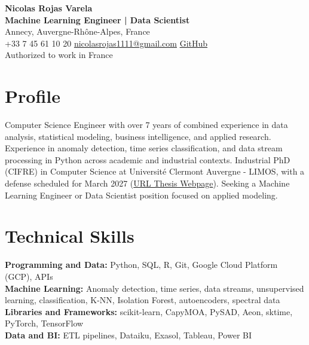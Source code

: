 \documentclass[12pt,a4paper]{article}
\begin{document}
{\centering
{\LARGE\textbf{Nicolas Rojas Varela}}\\[0.5mm]
{\large\textbf{Machine Learning Engineer | Data Scientist}}\\[0.5mm]
Annecy, Auvergne-Rhône-Alpes, France\\
+33 7 45 61 10 20 \textbar{} \href{mailto:nicolasrojas1111@gmail.com}{nicolasrojas1111@gmail.com} \textbar{} \href{https://github.com/nirojasva}{GitHub}\\
Authorized to work in France\par}
\vspace{1pt}

\section*{Profile}
Computer Science Engineer with over 7 years of combined experience in data analysis, statistical modeling, business intelligence, and applied research. Experience in anomaly detection, time series classification, and data stream processing in Python across academic and industrial contexts. Industrial PhD (CIFRE) in Computer Science at Université Clermont Auvergne - LIMOS, with a defense scheduled for March 2027 (\href{https://spectral-anomaly-detector.limos.fr/index_en.html}{URL Thesis Webpage}). Seeking a Machine Learning Engineer or Data Scientist position focused on applied modeling.

\section*{Technical Skills}
\textbf{Programming and Data:} Python, SQL, R, Git, Google Cloud Platform (GCP), APIs\\
\textbf{Machine Learning:} Anomaly detection, time series, data streams, unsupervised learning, classification, K-NN, Isolation Forest, autoencoders, spectral data\\
\textbf{Libraries and Frameworks:} scikit-learn, CapyMOA, PySAD, Aeon, sktime, PyTorch, TensorFlow\\
\textbf{Data and BI:} ETL pipelines, Dataiku, Exasol, Tableau, Power BI
\end{document}
